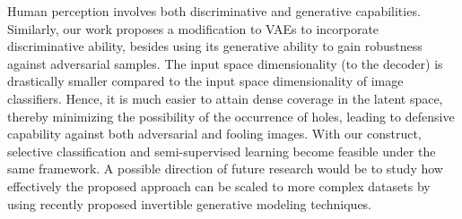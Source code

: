 \documentclass[letterpaper]{article} %
\begin{document}
Human perception involves both discriminative and generative capabilities. Similarly, our work proposes a modification to VAEs to incorporate discriminative ability, besides using its generative ability to gain robustness against adversarial samples. The input space dimensionality (to the decoder) is drastically smaller compared to the input space dimensionality of image classifiers. Hence, it is much easier to attain dense coverage in the latent space, thereby minimizing the possibility of the occurrence of holes, leading to defensive capability against both adversarial and fooling images. With our construct, selective classification and semi-supervised learning become feasible under the same framework. A possible direction of future research would be to study how effectively the proposed approach can be scaled to more complex datasets by using recently proposed invertible generative modeling techniques.
\end{document}

